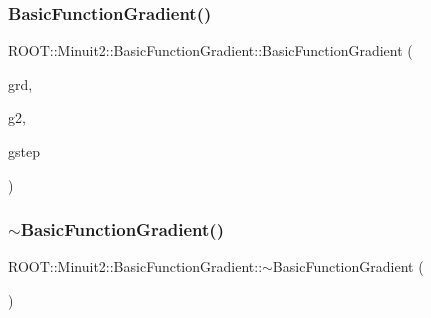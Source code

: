 \subsubsection{\texorpdfstring{BasicFunctionGradient()}{BasicFunctionGradient()}\hspace{0.1cm}{\footnotesize\ttfamily [11/12]}}
{\footnotesize\ttfamily R\+O\+O\+T\+::\+Minuit2\+::\+Basic\+Function\+Gradient\+::\+Basic\+Function\+Gradient (\begin{DoxyParamCaption}\item[{const \mbox{\hyperlink{namespaceROOT_1_1Minuit2_a62ed97730a1ca8d3fbaec64a19aa11c9}{Mn\+Algebraic\+Vector}} \&}]{grd,  }\item[{const \mbox{\hyperlink{namespaceROOT_1_1Minuit2_a62ed97730a1ca8d3fbaec64a19aa11c9}{Mn\+Algebraic\+Vector}} \&}]{g2,  }\item[{const \mbox{\hyperlink{namespaceROOT_1_1Minuit2_a62ed97730a1ca8d3fbaec64a19aa11c9}{Mn\+Algebraic\+Vector}} \&}]{gstep }\end{DoxyParamCaption})\hspace{0.3cm}{\ttfamily [inline]}}

\mbox{\label{classROOT_1_1Minuit2_1_1BasicFunctionGradient_a55ce8afeb4e559cf2d2c88aca167b524}} 
\subsubsection{\texorpdfstring{$\sim$BasicFunctionGradient()}{~BasicFunctionGradient()}\hspace{0.1cm}{\footnotesize\ttfamily [3/3]}}
{\footnotesize\ttfamily R\+O\+O\+T\+::\+Minuit2\+::\+Basic\+Function\+Gradient\+::$\sim$\+Basic\+Function\+Gradient (\begin{DoxyParamCaption}{ }\end{DoxyParamCaption})\hspace{0.3cm}{\ttfamily [inline]}}

\mbox{\label{classROOT_1_1Minuit2_1_1BasicFunctionGradient_a1193087c872c26bca560f069f2efc353}} 

